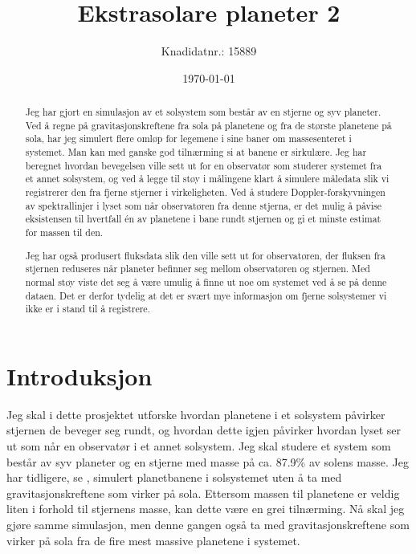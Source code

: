 \documentclass[reprint, english,notitlepage]{revtex4-1}  %
\begin{document}
\title{Ekstrasolare planeter 2}
\date{\today}
\author{Knadidatnr.: 15889}


\newpage

\begin{abstract}
Jeg har gjort en simulasjon av et solsystem som består av en stjerne og syv planeter. Ved å regne på gravitasjonskreftene fra sola på planetene og fra de største planetene på sola, har jeg simulert flere omløp for legemene i sine baner om massesenteret i systemet. Man kan med ganske god tilnærming si at banene er sirkulære. Jeg har beregnet hvordan bevegelsen ville sett ut for en observatør som studerer systemet fra et annet solsystem, og ved å legge til støy i målingene klart å simulere måledata slik vi registrerer den fra fjerne stjerner i virkeligheten. Ved å studere Doppler-forskyvningen av spektrallinjer i lyset som når observatøren fra denne stjerna, er det mulig å påvise eksistensen til hvertfall én av planetene i bane rundt stjernen og gi et minste estimat for massen til den.

Jeg har også produsert fluksdata slik den ville sett ut for observatøren, der fluksen fra stjernen reduseres når planeter befinner seg mellom observatøren og stjernen. Med normal støy viste det seg å være umulig å finne ut noe om systemet ved å se på denne dataen. Det er derfor tydelig at det er svært mye informasjon om fjerne solsystemer vi ikke er i stand til å registrere.
\end{abstract}
\maketitle                                %



\section{Introduksjon}

Jeg skal i dette prosjektet utforske hvordan planetene i et solsystem påvirker stjernen de beveger seg rundt, og hvordan dette igjen påvirker hvordan lyset ser ut som når en observatør i et annet solsystem. Jeg skal studere et system som består av syv planeter og en stjerne med masse på ca. 87.9\% av solens masse. Jeg har tidligere, se \citep{paper1B}, simulert planetbanene i solsystemet uten å ta med gravitasjonskreftene som virker på sola. Ettersom massen til planetene er veldig liten i forhold til stjernens masse, kan dette være en grei tilnærming. Nå skal jeg gjøre samme simulasjon, men denne gangen også ta med gravitasjonskreftene som virker på sola fra de fire mest massive planetene i systemet.
\end{document}
